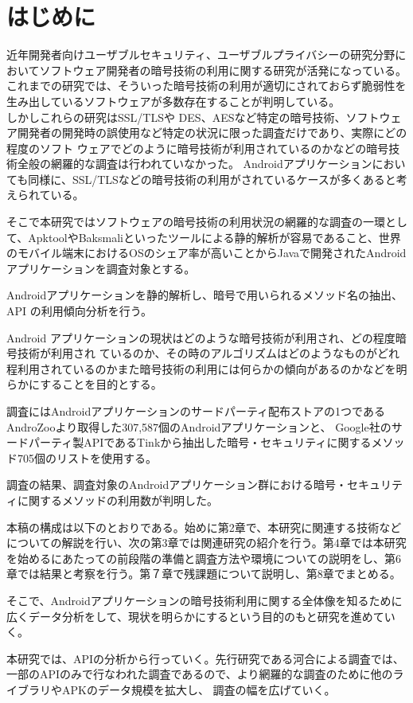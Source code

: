 \newpage
\section{はじめに} 
近年開発者向けユーザブルセキュリティ、ユーザブルプライバシーの研究分野においてソフトウェア開発者の暗号技術の利用に関する研究が活発になっている。
これまでの研究では、そういった暗号技術の利用が適切にされておらず脆弱性を生み出しているソフトウェアが多数存在することが判明している。
\\しかしこれらの研究はSSL/TLSや DES、AESなど特定の暗号技術、ソフトウェア開発者の開発時の誤使用など特定の状況に限った調査だけであり、実際にどの程度のソフト
ウェアでどのように暗号技術が利用されているのかなどの暗号技術全般の網羅的な調査は行われていなかった。
Androidアプリケーションにおいても同様に、SSL/TLSなどの暗号技術の利用がされているケースが多くあると考えられている。

そこで本研究ではソフトウェアの暗号技術の利用状況の網羅的な調査の一環として、ApktoolやBaksmaliといったツールによる静的解析が容易であること、世界のモバイル端末におけるOSのシェア率が高いこと\cite{share}からJavaで開発されたAndroidアプリケーションを調査対象とする。


Androidアプリケーションを静的解析し、暗号で用いられるメソッド名の抽出、API の利用傾向分析を行う。

Android アプリケーションの現状はどのような暗号技術が利用され、どの程度暗号技術が利用され
ているのか、その時のアルゴリズムはどのようなものがどれ程利用されているのかまた暗号技術の利用には何らかの傾向があるのかなどを明らかにすることを目的とする。


調査にはAndroidアプリケーションのサードパーティ配布ストアの1つであるAndroZooより取得した307,587個のAndroidアプリケーションと、
Google社のサードパーティ製APIであるTinkから抽出した暗号・セキュリティに関するメソッド705個のリストを使用する。



調査の結果、調査対象のAndroidアプリケーション群における暗号・セキュリティに関するメソッドの利用数が判明した。


本稿の構成は以下のとおりである。始めに第2章で、本研究に関連する技術などについての解説を行い、次の第3章では関連研究の紹介を行う。第4章では本研究を始めるにあたっての前段階の準備と調査方法や環境についての説明をし、第6章では結果と考察を行う。第７章で残課題について説明し、第8章でまとめる。



そこで、Androidアプリケーションの暗号技術利用に関する全体像を知るために広くデータ分析をして、現状を明らかにするという目的のもと研究を進めていく。


本研究では、APIの分析から行っていく。先行研究である河合による調査では、一部のAPIのみで行なわれた調査であるので、より網羅的な調査のために他のライブラリやAPKのデータ規模を拡大し、
調査の幅を広げていく。
\fi